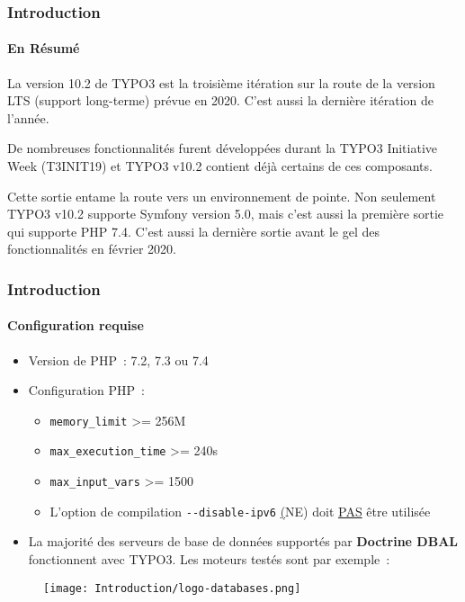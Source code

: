 \begin{frame}[fragile]
	\frametitle{Introduction}
	\framesubtitle{En Résumé}

	\small
		La version 10.2 de TYPO3 est la troisième itération sur la route de
		la version LTS (support long-terme) prévue en 2020. C'est aussi la
		dernière itération de l'année.

		\vspace{0.2cm}

		De nombreuses fonctionnalités furent développées durant la TYPO3 Initiative Week (T3INIT19)
		et TYPO3 v10.2 contient déjà certains de ces composants.

		\vspace{0.2cm}

		Cette sortie entame la route vers un environnement de pointe. Non seulement
		TYPO3 v10.2 supporte Symfony version 5.0, mais c'est aussi la première sortie
		qui supporte PHP 7.4. C'est aussi la dernière sortie avant le gel des fonctionnalités
		en février 2020.

	\normalsize

\end{frame}


\begin{frame}[fragile]
	\frametitle{Introduction}
	\framesubtitle{Configuration requise}

	\begin{itemize}
		\item Version de PHP~: 7.2, 7.3 ou 7.4
		\item Configuration PHP~:

			\begin{itemize}
				\item \texttt{memory\_limit} >= 256M
				\item \texttt{max\_execution\_time} >= 240s
				\item \texttt{max\_input\_vars} >= 1500
				\item L'option de compilation \texttt{-}\texttt{-disable-ipv6}
					\underline(NE) doit \underline{PAS} être utilisée
			\end{itemize}

		\item La majorité des serveurs de base de données supportés par \textbf{Doctrine DBAL}
			fonctionnent avec TYPO3. Les moteurs testés sont par exemple~:
	\end{itemize}

	\begin{figure}
		\texttt{[image: Introduction/logo-databases.png]}
	\end{figure}

\end{frame}

